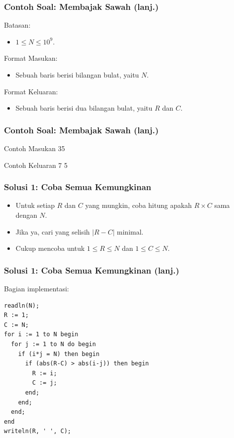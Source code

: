 \documentclass{beamer}
\begin{document}
\begin{frame}
\frametitle{Contoh Soal: Membajak Sawah (lanj.)}
Batasan:
\begin{itemize}
	\item $1 \le N \le 10^9$.
\end{itemize}

\hfill

Format Masukan:
\begin{itemize}
	\item Sebuah baris berisi bilangan bulat, yaitu $N$.
\end{itemize}

\hfill

Format Keluaran:
\begin{itemize}
	\item Sebuah baris berisi dua bilangan bulat, yaitu $R$ dan $C$.
\end{itemize}

\end{frame}

\begin{frame}
\frametitle{Contoh Soal: Membajak Sawah (lanj.)}

\begin{block}{Contoh Masukan}
35
\end{block}

\hfill

\begin{block}{Contoh Keluaran}
7 5
\end{block}

\end{frame}

\begin{frame}
\frametitle{Solusi 1: Coba Semua Kemungkinan}
\begin{itemize}
	\item Untuk setiap $R$ dan $C$ yang mungkin, coba hitung apakah $R \times C$ sama dengan $N$.
	\item Jika ya, cari yang selisih $|R-C|$ minimal.
	\item Cukup mencoba untuk $1 \le R \le N$ dan $1 \le C \le N$.
\end{itemize}
\end{frame}

\begin{frame}[fragile]
\frametitle{Solusi 1: Coba Semua Kemungkinan (lanj.)}
Bagian implementasi:
\begin{lstlisting}
readln(N);
R := 1;
C := N;
for i := 1 to N begin
  for j := 1 to N do begin
    if (i*j = N) then begin
      if (abs(R-C) > abs(i-j)) then begin
        R := i;
        C := j;	
      end;
    end;
  end;
end
writeln(R, ' ', C);
\end{lstlisting}
\end{frame}
\end{document}
